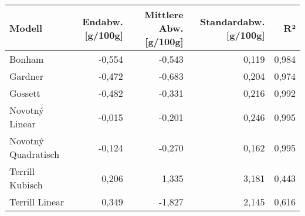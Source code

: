 \begin{tabular}{lrrrr}
\toprule
             Modell &  Endabw. [g/100g] &  Mittlere Abw. [g/100g] &  Standardabw. [g/100g] &    R² \\
\midrule
             Bonham &            -0,554 &                  -0,543 &                  0,119 & 0,984 \\
            Gardner &            -0,472 &                  -0,683 &                  0,204 & 0,974 \\
            Gossett &            -0,482 &                  -0,331 &                  0,216 & 0,992 \\
     Novotný Linear &            -0,015 &                  -0,201 &                  0,246 & 0,995 \\
Novotný Quadratisch &            -0,124 &                  -0,270 &                  0,162 & 0,995 \\
    Terrill Kubisch &             0,206 &                   1,335 &                  3,181 & 0,443 \\
     Terrill Linear &             0,349 &                  -1,827 &                  2,145 & 0,616 \\
\bottomrule
\end{tabular}
